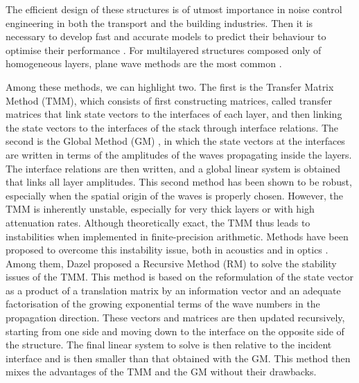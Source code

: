The efficient design of these structures is of utmost importance in noise control engineering in both the transport and the building industries. Then it is necessary to develop fast and accurate models to predict their behaviour to optimise their performance \cite{velosoInsertionLossPrediction2023,yangPredictionSoundAbsorption2022,zhangAcceleratedTopologicalDesign2021,boulvert2020}. For multilayered structures composed only of homogeneous layers, plane wave methods are the most common \cite{allard2009}. 

Among these methods, we can highlight two. The first is the Transfer Matrix Method (TMM), \cite{brouard1995general, khuranaDescriptionTransverselyIsotropic2009a, boltonSOUNDTRANSMISSIONMULTIPANEL1996} which consists of first constructing matrices, called transfer matrices that link state vectors to the interfaces of each layer, and then linking the state vectors to the interfaces of the stack through interface relations. The second is the Global Method (GM) \cite{lowe1995}, in which the state vectors at the interfaces are written in terms of the amplitudes of the waves propagating inside the layers. The interface relations are then written, and a global linear system is obtained that links all layer amplitudes. This second method has been shown to be robust, especially when the spatial origin of the waves is properly chosen. However, the TMM is inherently unstable, especially for very thick layers or with high attenuation rates. Although theoretically exact, the TMM thus leads to instabilities when implemented in finite-precision arithmetic. Methods have been proposed to overcome this instability issue, both in acoustics and in optics \cite{yinImprovedTransferMatrix2008, hung-yuSpectralRecursiveTransformation1997, song2023}. Among them, Dazel \etal \cite{dazel2013} proposed a Recursive Method (RM) to solve the stability issues of the TMM. This method is based on the reformulation of the state vector as a product of a translation matrix by an information vector and an adequate factorisation of the growing exponential terms of the wave numbers in the propagation direction. These vectors and matrices are then updated recursively, starting from one side and moving down to the interface on the opposite side of the structure. The final linear system to solve is then relative to the incident interface and is then smaller than that obtained with the GM. This method then mixes the advantages of the TMM and the GM without their drawbacks.\\

